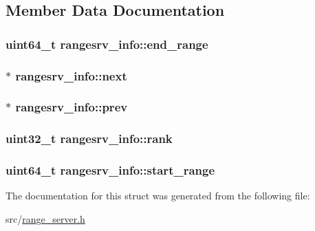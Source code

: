 \subsection{Member Data Documentation}
\hypertarget{structrangesrv__info_a680d57d20fcb44d199e4b313acd5db5f}{
\subsubsection[{end\-\_\-range}]{\setlength{\rightskip}{0pt plus 5cm}uint64\-\_\-t rangesrv\-\_\-info\-::end\-\_\-range}}\label{da/dce/structrangesrv__info_a680d57d20fcb44d199e4b313acd5db5f}
\hypertarget{structrangesrv__info_a7f87ab56d045e24e315b354075208b6d}{
\subsubsection[{next}]{$\ast$ rangesrv\-\_\-info\-::next}}\label{da/dce/structrangesrv__info_a7f87ab56d045e24e315b354075208b6d}
\hypertarget{structrangesrv__info_af0a671859e5383bf4bab7f7a53b49b3b}{
\subsubsection[{prev}]{$\ast$ rangesrv\-\_\-info\-::prev}}\label{da/dce/structrangesrv__info_af0a671859e5383bf4bab7f7a53b49b3b}
\hypertarget{structrangesrv__info_af545372bc5a40a38b84408a208866960}{
\subsubsection[{rank}]{\setlength{\rightskip}{0pt plus 5cm}uint32\-\_\-t rangesrv\-\_\-info\-::rank}}\label{da/dce/structrangesrv__info_af545372bc5a40a38b84408a208866960}
\hypertarget{structrangesrv__info_a5d3db4c7e640ad001ef9b4754ede40d4}{
\subsubsection[{start\-\_\-range}]{\setlength{\rightskip}{0pt plus 5cm}uint64\-\_\-t rangesrv\-\_\-info\-::start\-\_\-range}}\label{da/dce/structrangesrv__info_a5d3db4c7e640ad001ef9b4754ede40d4}


The documentation for this struct was generated from the following file\-:\begin{DoxyCompactItemize}
\item 
src/\hyperlink{range__server_8h}{range\-\_\-server.\-h}\end{DoxyCompactItemize}
